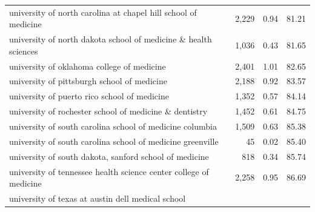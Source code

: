 \begin{table}[!h]
\begin{tabular}{llll}
\multicolumn{1}{l}{\hspace{1em}university of north carolina at chapel hill school of medicine} &
  \multicolumn{1}{r}{2,229} &
  \multicolumn{1}{r}{0.94} &
  \multicolumn{1}{r}{81.21} \\
\multicolumn{1}{l}{\hspace{1em}university of north dakota school of medicine \& health sciences} &
  \multicolumn{1}{r}{1,036} &
  \multicolumn{1}{r}{0.43} &
  \multicolumn{1}{r}{81.65} \\
\multicolumn{1}{l}{\hspace{1em}university of oklahoma college of medicine} &
  \multicolumn{1}{r}{2,401} &
  \multicolumn{1}{r}{1.01} &
  \multicolumn{1}{r}{82.65} \\
\multicolumn{1}{l}{\hspace{1em}university of pittsburgh school of medicine} &
  \multicolumn{1}{r}{2,188} &
  \multicolumn{1}{r}{0.92} &
  \multicolumn{1}{r}{83.57} \\
\multicolumn{1}{l}{\hspace{1em}university of puerto rico school of medicine} &
  \multicolumn{1}{r}{1,352} &
  \multicolumn{1}{r}{0.57} &
  \multicolumn{1}{r}{84.14} \\
\multicolumn{1}{l}{\hspace{1em}university of rochester school of medicine \& dentistry} &
  \multicolumn{1}{r}{1,452} &
  \multicolumn{1}{r}{0.61} &
  \multicolumn{1}{r}{84.75} \\
\multicolumn{1}{l}{\hspace{1em}university of south carolina school of medicine columbia} &
  \multicolumn{1}{r}{1,509} &
  \multicolumn{1}{r}{0.63} &
  \multicolumn{1}{r}{85.38} \\
\multicolumn{1}{l}{\hspace{1em}university of south carolina school of medicine greenville} &
  \multicolumn{1}{r}{45} &
  \multicolumn{1}{r}{0.02} &
  \multicolumn{1}{r}{85.40} \\
\multicolumn{1}{l}{\hspace{1em}university of south dakota, sanford school of medicine} &
  \multicolumn{1}{r}{818} &
  \multicolumn{1}{r}{0.34} &
  \multicolumn{1}{r}{85.74} \\
\multicolumn{1}{l}{\hspace{1em}university of tennessee health science center college of medicine} &
  \multicolumn{1}{r}{2,258} &
  \multicolumn{1}{r}{0.95} &
  \multicolumn{1}{r}{86.69} \\
\multicolumn{1}{l}{\hspace{1em}university of texas at austin dell medical school} &

\end{tabular}
\end{table}
